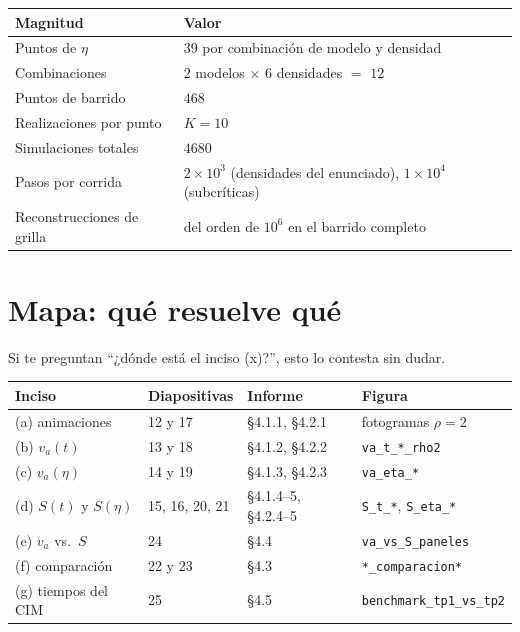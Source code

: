 \documentclass[11pt]{article}
\begin{document}
\begin{center}
\begin{tabular}{lp{9.4cm}}
  \toprule
  Magnitud & Valor \\
  \midrule
  Puntos de $\eta$ & $39$ por combinación de modelo y densidad \\
  Combinaciones & $2$ modelos $\times$ $6$ densidades $=$ $12$ \\
  Puntos de barrido & $468$ \\
  Realizaciones por punto & $K = 10$ \\
  Simulaciones totales & $4680$ \\
  Pasos por corrida & $2\times10^3$ (densidades del enunciado), $1\times10^4$ (subcríticas) \\
  Reconstrucciones de grilla & del orden de $10^6$ en el barrido completo \\
  \bottomrule
\end{tabular}
\end{center}


\section{Mapa: qué resuelve qué}
\label{sec:mapa}

Si te preguntan ``¿dónde está el inciso (x)?'', esto lo contesta sin dudar.

\begin{center}
\begin{tabular}{llll}
  \toprule
  Inciso & Diapositivas & Informe & Figura \\
  \midrule
  (a) animaciones          & 12 y 17 & \S4.1.1, \S4.2.1 & fotogramas $\rho = 2$ \\
  (b) $v_a(t)$             & 13 y 18 & \S4.1.2, \S4.2.2 & \texttt{va\_t\_*\_rho2} \\
  (c) $v_a(\eta)$          & 14 y 19 & \S4.1.3, \S4.2.3 & \texttt{va\_eta\_*} \\
  (d) $S(t)$ y $S(\eta)$   & 15, 16, 20, 21 & \S4.1.4--5, \S4.2.4--5 & \texttt{S\_t\_*}, \texttt{S\_eta\_*} \\
  (e) $v_a$ vs.\ $S$       & 24 & \S4.4 & \texttt{va\_vs\_S\_paneles} \\
  (f) comparación          & 22 y 23 & \S4.3 & \texttt{*\_comparacion*} \\
  (g) tiempos del CIM      & 25 & \S4.5 & \texttt{benchmark\_tp1\_vs\_tp2} \\
  \bottomrule
\end{tabular}
\end{center}
\end{document}
